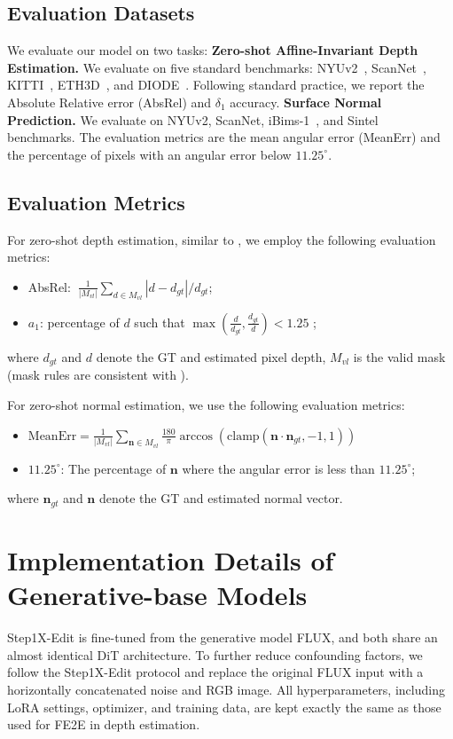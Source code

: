 \documentclass{article} %
\begin{document}
\subsection{Evaluation Datasets}
\label{supp:evadata}
We evaluate our model on two tasks: \textbf{Zero-shot Affine-Invariant Depth Estimation.} We evaluate on five standard benchmarks: NYUv2~\citep{nyuv2}, ScanNet~\citep{scannet}, KITTI~\citep{kitti}, ETH3D~\citep{eth3d}, and DIODE~\citep{diode}. Following standard practice, we report the Absolute Relative error (AbsRel) and $\delta_1$ accuracy. \textbf{Surface Normal Prediction.} We evaluate on NYUv2, ScanNet, iBims-1~\citep{ibims}, and Sintel~\citep{sintel} benchmarks. The evaluation metrics are the mean angular error (MeanErr) and the percentage of pixels with an angular error below $11.25^{\circ}$. 

\subsection{Evaluation Metrics}
\label{supp:metric}
For zero-shot depth estimation, similar to \citep{marigold}, we employ the following  evaluation metrics:
\begin{itemize}
  \item AbsRel:  $\ \frac{1}{|{M}_{vl}|} \sum_{d \in {M}_{vl}}\left|d-d_{gt}\right| / d_{gt}$;
  \item ${a}_{1}$: percentage of $d$ such that $\max(\frac{d}{d_{gt}},\frac{d_{gt}}{d}) < 1.25$ ;
\end{itemize}
where $d_{gt}$ and $d$ denote the GT and estimated pixel depth, ${M}_{vl}$ is the valid mask (mask rules are consistent with \citep{lotus}). 

For zero-shot normal estimation, we use the following evaluation metrics:
\begin{itemize}
\item $
\text{MeanErr} = \frac{1}{|{M}_{vl}|} \sum_{\mathbf{n} \in {M}_{vl}} \frac{180}{\pi} \arccos(\text{clamp}(\mathbf{n} \cdot \mathbf{n}_{gt}, -1, 1))
$

\item \textbf{$11.25^{\circ}$}: The percentage of $\mathbf{n}$ where the angular error is less than $11.25^{\circ}$;
\end{itemize}
where $\mathbf{n}_{gt}$ and $\mathbf{n}$ denote the GT and estimated normal vector.

\section{Implementation Details of Generative-base Models}
\label{supp:gen}
Step1X-Edit is fine-tuned from the generative model FLUX, and both share an almost identical DiT architecture. To further reduce confounding factors, we follow the Step1X-Edit protocol and replace the original FLUX input with a horizontally concatenated noise and RGB image. All hyperparameters, including LoRA settings, optimizer, and training data, are kept exactly the same as those used for FE2E in depth estimation.
\end{document}

